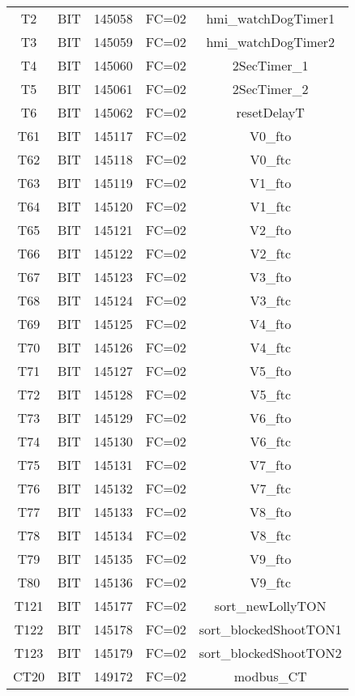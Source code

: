 \begin{center}
\begin{longtable}[c]{ |c|c|c|c|c| }
        T2	&	BIT	&	145058	&	FC=02	&	hmi\_watchDogTimer1\\
        T3	&	BIT	&	145059	&	FC=02	&	hmi\_watchDogTimer2\\
        T4	&	BIT	&	145060	&	FC=02	&	2SecTimer\_1\\
        T5	&	BIT	&	145061	&	FC=02	&	2SecTimer\_2\\
        T6	&	BIT	&	145062	&	FC=02	&	resetDelayT\\
        T61	&	BIT	&	145117	&	FC=02	&	V0\_fto\\
        T62	&	BIT	&	145118	&	FC=02	&	V0\_ftc\\
        T63	&	BIT	&	145119	&	FC=02	&	V1\_fto\\
        T64	&	BIT	&	145120	&	FC=02	&	V1\_ftc\\
        T65	&	BIT	&	145121	&	FC=02	&	V2\_fto\\
        T66	&	BIT	&	145122	&	FC=02	&	V2\_ftc\\
        T67	&	BIT	&	145123	&	FC=02	&	V3\_fto\\
        T68	&	BIT	&	145124	&	FC=02	&	V3\_ftc\\
        T69	&	BIT	&	145125	&	FC=02	&	V4\_fto\\
        T70	&	BIT	&	145126	&	FC=02	&	V4\_ftc\\
        T71	&	BIT	&	145127	&	FC=02	&	V5\_fto\\
        T72	&	BIT	&	145128	&	FC=02	&	V5\_ftc\\
        T73	&	BIT	&	145129	&	FC=02	&	V6\_fto\\
        T74	&	BIT	&	145130	&	FC=02	&	V6\_ftc\\
        T75	&	BIT	&	145131	&	FC=02	&	V7\_fto\\
        T76	&	BIT	&	145132	&	FC=02	&	V7\_ftc\\
        T77	&	BIT	&	145133	&	FC=02	&	V8\_fto\\
        T78	&	BIT	&	145134	&	FC=02	&	V8\_ftc\\
        T79	&	BIT	&	145135	&	FC=02	&	V9\_fto\\
        T80	&	BIT	&	145136	&	FC=02	&	V9\_ftc\\
        T121	&	BIT	&	145177	&	FC=02	&	sort\_newLollyTON\\
        T122	&	BIT	&	145178	&	FC=02	&	sort\_blockedShootTON1\\
        T123	&	BIT	&	145179	&	FC=02	&	sort\_blockedShootTON2\\
        CT20	&	BIT	&	149172	&	FC=02	&	modbus\_CT\\

\end{longtable}
\end{center}
